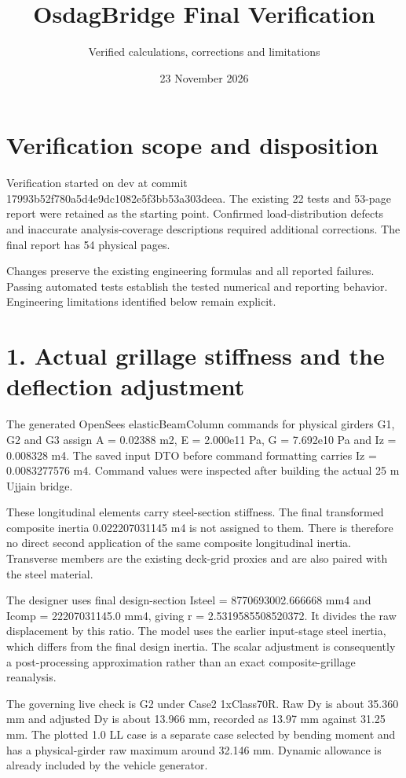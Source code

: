 \documentclass{article}%
\title{OsdagBridge Final Verification}\author{Verified calculations, corrections and limitations}\date{23 November 2026}%
\begin{document}
%
\normalsize%
\maketitle%
\section*{Verification scope and disposition}%
\label{sec:Verificationscopeanddisposition}%
Verification started on dev at commit 17993b52f780a5d4e9dc1082e5f3bb53a303deea. The existing 22 tests and 53{-}page report were retained as the starting point. Confirmed load{-}distribution defects and inaccurate analysis{-}coverage descriptions required additional corrections. The final report has 54 physical pages.%


%
Changes preserve the existing engineering formulas and all reported failures. Passing automated tests establish the tested numerical and reporting behavior. Engineering limitations identified below remain explicit.%

%
\section*{1. Actual grillage stiffness and the deflection adjustment}%
\label{sec:1.Actualgrillagestiffnessandthedeflectionadjustment}%
The generated OpenSees elasticBeamColumn commands for physical girders G1, G2 and G3 assign A = 0.02388 m2, E = 2.000e11 Pa, G = 7.692e10 Pa and Iz = 0.008328 m4. The saved input DTO before command formatting carries Iz = 0.0083277576 m4. Command values were inspected after building the actual 25 m Ujjain bridge.%


%
These longitudinal elements carry steel{-}section stiffness. The final transformed composite inertia 0.022207031145 m4 is not assigned to them. There is therefore no direct second application of the same composite longitudinal inertia. Transverse members are the existing deck{-}grid proxies and are also paired with the steel material.%


%
The designer uses final design{-}section Isteel = 8770693002.666668 mm4 and Icomp = 22207031145.0 mm4, giving r = 2.5319585508520372. It divides the raw displacement by this ratio. The model uses the earlier input{-}stage steel inertia, which differs from the final design inertia. The scalar adjustment is consequently a post{-}processing approximation rather than an exact composite{-}grillage reanalysis.%


%
The governing live check is G2 under Case2 1xClass70R. Raw Dy is about 35.360 mm and adjusted Dy is about 13.966 mm, recorded as 13.97 mm against 31.25 mm. The plotted 1.0 LL case is a separate case selected by bending moment and has a physical{-}girder raw maximum around 32.146 mm. Dynamic allowance is already included by the vehicle generator.%
\end{document}
